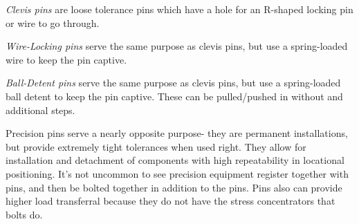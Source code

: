 \documentclass[10pt,letterpaper]{book}
\begin{document}
	\begin{asparaenum}[a)]
		\item \textit{Clevis pins} are loose tolerance pins which have a hole for an R-shaped locking pin or wire to go through.
		\item \textit{Wire-Locking pins} serve the same purpose as clevis pins, but use a spring-loaded wire to keep the pin captive.
		\item \textit{Ball-Detent pins} serve the same purpose as clevis pins, but use a spring-loaded ball detent to keep the pin captive. These can be pulled/pushed in without and additional steps.
	\end{asparaenum}
	
	
	Precision pins serve a nearly opposite purpose- they are permanent installations, but provide extremely tight tolerances when used right. They allow for installation and detachment of components with high repeatability in locational positioning. It's not uncommon to see precision equipment register together with pins, and then be bolted together in addition to the pins. Pins also can provide higher load transferral because they do not have the stress concentrators that bolts do.
	
\end{document}
